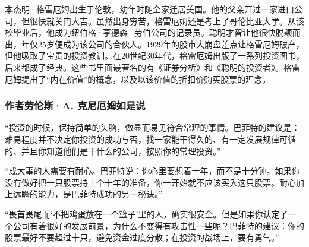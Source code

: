 本杰明·格雷厄姆出生于伦敦，幼年时随全家迁居美国。他的父亲开过一家进口公司，但很快就关门大吉。虽然出身穷苦，格雷厄姆还是考上了哥伦比亚大学。从该校毕业后，他成为纽伯格·亨德森·劳伯公司的记录员。聪明才智让他很快脱颖而出，年仅25岁便成为该公司的合伙人。1929年的股市大崩盘差点让格雷厄姆破产，但他吸取了宝贵的投资教训。在20世纪30年代，格雷厄姆出版了一系列投资图书，后来都成了经典。这些书里面最著名的有《证券分析》和《聪明的投资者》。格雷厄姆提出了“内在价值”的概念，以及以该价值的折扣价购买股票的理念。
\par


\subsubsection*{作者劳伦斯·A. 克尼厄姆如是说}

“投资的时候，保持简单的头脑，做显而易见符合常理的事情。巴菲特的建议是：难易程度并不决定你投资的成功与否，找一家能干得久的、有一定发展规律可循的、并且你知道他们是干什么的公司，按照你的常理投资。”
\par

“成大事的人需要有耐心。巴菲特说：你心里要想着十年，而不是十分钟。如果你没有做好把一只股票持上个十年的准备，你一开始就不应该买入这只股票。耐心加上远瞻的能力，是巴菲特成功的另一秘诀。”
\par

“畏首畏尾而‘不把鸡蛋放在一个篮子’里的人，确实很安全。但是如果你认定了一个公司有着很好的发展前景，为什么不变得有攻击性一些呢？巴菲特的建议：你的股票最好不要超过十只，避免资金过度分散；在投资的战场上，要有勇气。”
\par
